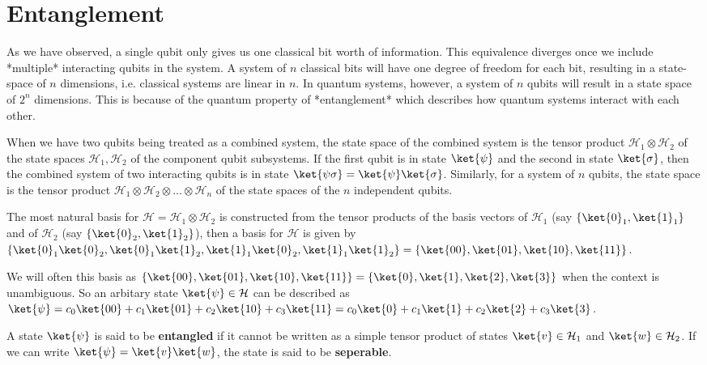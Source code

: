 \section{Entanglement}
As we have observed, a single qubit only gives us one classical bit worth of information. This equivalence diverges once we include *multiple* interacting qubits in the system. A system of $n$ classical bits will have one degree of freedom for each bit, resulting in a state-space of $n$ dimensions, i.e. classical systems are linear in $n$. In quantum systems, however, a system of $n$ qubits will result in a state space of $2^n$ dimensions. This is because of the quantum property of *entanglement* which describes how quantum systems interact with each other.

\begin{lemma}
When we have two qubits being treated as a combined system, the state space of the combined system is the tensor product $\mathcal{H}_1 \otimes \mathcal{H}_2$ of the state spaces $\mathcal{H}_1, \mathcal{H}_2$ of the component qubit subsystems. If the first qubit is in state $\ket{\psi}$ and the second in state $\ket{\sigma}$, then the combined system of two interacting qubits is in state $\ket{\psi\sigma} = \ket{\psi}\ket{\sigma}$. Similarly, for a system of $n$ qubits, the state space is the tensor product $\mathcal{H}_1 \otimes \mathcal{H}_2 \otimes ... \otimes \mathcal{H}_n$ of the state spaces of the $n$ independent qubits.
\end{lemma}

The most natural basis for $\mathcal{H} = \mathcal{H}_1 \otimes \mathcal{H}_2$ is constructed from the tensor products of the basis vectors of $\mathcal{H}_1$ (say $\{ \ket{0}_1, \ket{1}_1 \}$ and of $\mathcal{H}_2$ (say $\{ \ket{0}_2, \ket{1}_2 \}$), then a basis for $\mathcal{H}$ is given by $\{ \ket{0}_1\ket{0}_2, \ket{0}_1\ket{1}_2, \ket{1}_1\ket{0}_2, \ket{1}_1\ket{1}_2 \} \\ = \{ \ket{00}, \ket{01}, \ket{10}, \ket{11} \}$.

We will often this basis as $\{ \ket{00}, \ket{01}, \ket{10}, \ket{11} \} = \{ \ket{0}, \ket{1}, \ket{2}, \ket{3} \}$ when the context is unambiguous. So an arbitary state $\ket{\psi} \in \mathcal{H}$ can be described as $\ket{\psi} = c_0 \ket{00} + c_1 \ket{01} + c_2 \ket{10} + c_3 \ket{11} = c_0 \ket{0} + c_1 \ket{1} + c_2 \ket{2} + c_3 \ket{3}$.

\begin{defn}
A state $\ket{\psi}$ is said to be \textbf{entangled} if it cannot be written as a simple tensor product of states $\ket{v} \in \mathcal{H}_1$ and $\ket{w} \in \mathcal{H}_2$. If we can write $\ket{\psi} = \ket{v}\ket{w}$, the state is said to be \textbf{seperable}.
\end{defn}

